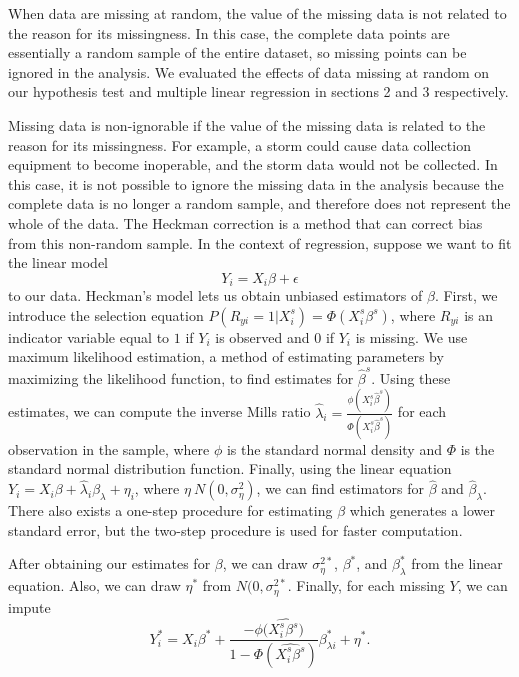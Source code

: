 When data are missing at random, the value of the missing data is not related to the reason for its missingness. In this case, the complete data points are essentially a random sample of the entire dataset, so missing points can be ignored in the analysis. We evaluated the effects of data missing at random on our hypothesis test and multiple linear regression in sections 2 and 3 respectively.

Missing data is non-ignorable if the value of the missing data is related to the reason for its missingness. For example, a storm could cause data collection equipment to become inoperable, and the storm data would not be collected. In this case, it is not possible to ignore the missing data in the analysis because the complete data is no longer a random sample, and therefore does not represent the whole of the data. The Heckman correction is a method that can correct bias from this non-random sample\cite{mnar}. In the context of regression, suppose we want to fit the linear model $$Y_{i} = X_{i}\beta+\epsilon$$ to our data. Heckman's model lets us obtain unbiased estimators of $\beta$. First, we introduce the selection equation $P(R_{yi} = 1 | X_{i}^{s}) = \Phi(X_{i}^{s}\beta^{s})$, where $R_{yi}$ is an indicator variable equal to $1$ if $Y_{i}$ is observed and $0$ if $Y_{i}$ is missing. We use maximum likelihood estimation, a method of estimating parameters by maximizing the likelihood function, to find estimates for $\hat{\beta}^{s}$. Using these estimates, we can compute the inverse Mills ratio $\hat{\lambda}_{i} = \frac{\phi(X_{i}^{s}\hat{\beta}^{s})}{\Phi(X_{i}^{s}\hat{\beta}^{s})}$ for each observation in the sample, where $\phi$ is the standard normal density and $\Phi$ is the standard normal distribution function. Finally, using the linear equation $Y_{i} = X_{i}\beta + \hat{\lambda}_{i}\beta_{\lambda} + \eta_{i}$, where $\eta ~ N(0,\sigma_{\eta}^{2})$, we can find estimators for $\hat{\beta}$ and $\hat{\beta}_{\lambda}$. There also exists a one-step procedure for estimating $\beta$ which generates a lower standard error, but the two-step procedure is used for faster computation.

After obtaining our estimates for $\beta$, we can draw $\sigma_{\eta}^{2*}$, $\beta^{*}$, and $\beta_{\lambda}^{*}$ from the linear equation. Also, we can draw $\eta^{*}$ from $N(0,\sigma_{\eta}^{2*}$. Finally, for each missing $Y$, we can impute $$Y_{i}^{*} = X_{i}\beta^{*} + \frac{-\phi(\widehat{X_{i}^{s}\beta^{s})}}{1-\Phi(\widehat{X_{i}^{s}\beta^{s}})}\beta_{\lambda i}^{*}+\eta^{*}.$$